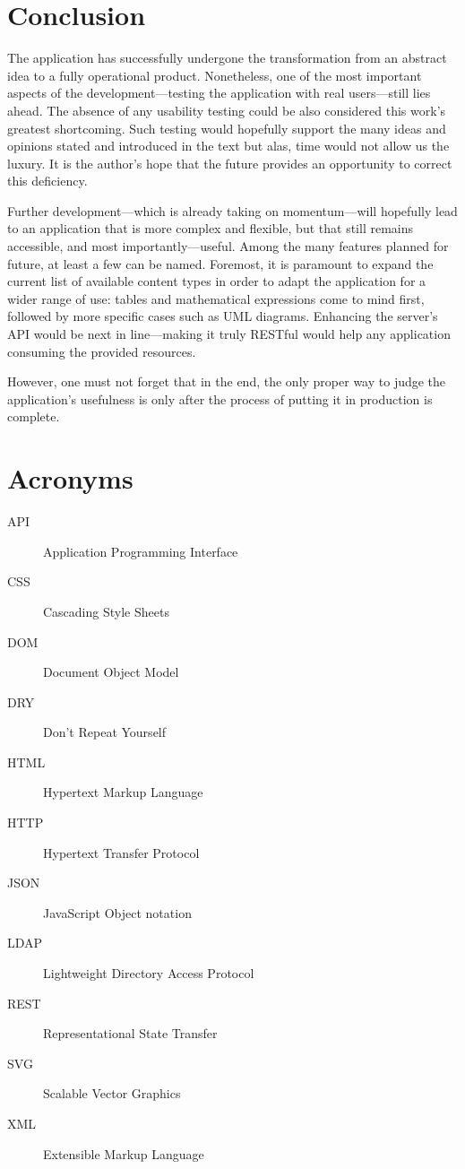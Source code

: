 \documentclass[thesis=M,english,hidelinks]{FITthesis}[2012/10/20]
\begin{document}
\chapter{Conclusion}

The application has successfully undergone the transformation from an abstract idea to a fully operational product. Nonetheless, one of the most important aspects of the development---testing the application with real users---still lies ahead. The absence of any usability testing could be also considered this work's greatest shortcoming. Such testing would hopefully support the many ideas and opinions stated and introduced in the text but alas, time would not allow us the luxury. It is the author's hope that the future provides an opportunity to correct this deficiency.

Further development---which is already taking on momentum---will hopefully lead to an application that is more complex and flexible, but that still remains accessible, and most importantly---useful. Among the many features planned for future, at least a few can be named. Foremost, it is paramount to expand the current list of available content types in order to adapt the application for a wider range of use: tables and mathematical expressions come to mind first, followed by more specific cases such as UML diagrams. Enhancing the server's API would be next in line---making it truly RESTful would help any application consuming the provided resources.

However, one must not forget that in the end, the only proper way to judge the application's usefulness is only after the process of putting it in production is complete.





\appendix

\chapter{Acronyms}

\begin{description}
  \item[API] Application Programming Interface
  \item[CSS] Cascading Style Sheets
  \item[DOM] Document Object Model
  \item[DRY] Don't Repeat Yourself
  \item[HTML] Hypertext Markup Language
  \item[HTTP] Hypertext Transfer Protocol
  \item[JSON] JavaScript Object notation
  \item[LDAP] Lightweight Directory Access Protocol
  \item[REST] Representational State Transfer
  \item[SVG] Scalable Vector Graphics
  \item[XML] Extensible Markup Language
\end{description}
\end{document}
